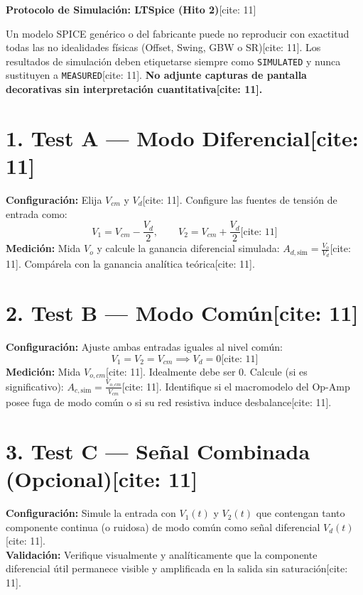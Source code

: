 \documentclass[11pt, a4paper]{article}
\begin{document}
\begin{center}
    \Large\textbf{\textcolor{ucbblue}{Protocolo de Simulación: LTSpice (Hito 2)}}[cite: 11]
\end{center}

\begin{tcolorbox}[colback=red!5, colframe=red!70!black, title=\textbf{Advertencia de Macromodelos[cite: 11]}]
    \raggedright
    Un modelo SPICE genérico o del fabricante puede no reproducir con exactitud todas las no idealidades físicas (Offset, Swing, GBW o SR)[cite: 11]. Los resultados de simulación deben etiquetarse siempre como \texttt{SIMULATED} y nunca sustituyen a \texttt{MEASURED}[cite: 11]. \textbf{No adjunte capturas de pantalla decorativas sin interpretación cuantitativa[cite: 11].}
\end{tcolorbox}

\section*{1. Test A — Modo Diferencial[cite: 11]}
\textbf{Configuración:} Elija $V_{cm}$ y $V_d$[cite: 11]. Configure las fuentes de tensión de entrada como:
\begin{equation}
    V_1 = V_{cm} - \frac{V_d}{2}, \qquad V_2 = V_{cm} + \frac{V_d}{2} \text{[cite: 11]}
\end{equation}
\textbf{Medición:} Mida $V_o$ y calcule la ganancia diferencial simulada: $A_{d,\mathrm{sim}} = \frac{V_o}{V_d}$[cite: 11]. Compárela con la ganancia analítica teórica[cite: 11].

\section*{2. Test B — Modo Común[cite: 11]}
\textbf{Configuración:} Ajuste ambas entradas iguales al nivel común:
\begin{equation}
    V_1 = V_2 = V_{cm} \implies V_d = 0 \text{[cite: 11]}
\end{equation}
\textbf{Medición:} Mida $V_{o,cm}$[cite: 11]. Idealmente debe ser 0. Calcule (si es significativo): $A_{c,\mathrm{sim}} = \frac{V_{o,cm}}{V_{cm}}$[cite: 11]. Identifique si el macromodelo del Op-Amp posee fuga de modo común o si su red resistiva induce desbalance[cite: 11].

\section*{3. Test C — Señal Combinada (Opcional)[cite: 11]}
\textbf{Configuración:} Simule la entrada con $V_1(t)$ y $V_2(t)$ que contengan tanto componente continua (o ruidosa) de modo común como señal diferencial $V_d(t)$[cite: 11]. \\
\textbf{Validación:} Verifique visualmente y analíticamente que la componente diferencial útil permanece visible y amplificada en la salida sin saturación[cite: 11].
\end{document}
